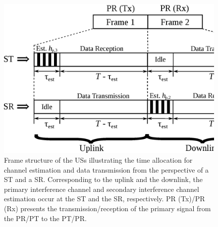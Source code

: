 \begin{figure}[!ht]
\centering
\includegraphics[width = \columnwidth]{figures/Frame_Structure}
\caption{Frame structure of the USs illustrating the time allocation for channel estimation and data transmission from the perspective of a ST and a SR. Corresponding to the uplink and the downlink, the primary interference channel and secondary interference channel estimation occur at the ST and the SR, respectively. PR (Tx)/PR (Rx) presents the transmission/reception of the primary signal from the PR/PT to the PT/PR.} 
\label{fig_US:fs}
\end{figure}



